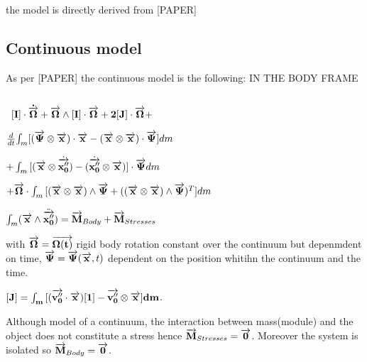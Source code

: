 the model is directly derived from [PAPER]
\subsection{Continuous model}
\label{Continuous model}

As per [PAPER] the continuous model is the following: IN THE BODY FRAME
\begin{center}
\begin{equation*} 
\end{equation*}
\end{center}\
$[\bf I]\cdot \dot{\overrightarrow{\bf \Omega}} + \overrightarrow{\bf \Omega} \wedge [\bf I]\cdot \overrightarrow{\bf \Omega} + 2[\bf J]\cdot \overrightarrow{\bf \Omega}+ $

${d\over dt}{\int_{m}[(\overrightarrow{\bf \Psi} \otimes \overrightarrow{\bf x})\cdot \overrightarrow{\bf x} - (\overrightarrow{\bf x}\otimes\overrightarrow{\bf x})\cdot \overrightarrow{\bf \Psi}]dm}$



$+ \int_{m}{[(\overrightarrow{\bf x}\otimes \dot{\overrightarrow{\bf x''_{0}}}) - (\dot{\overrightarrow{\bf x''_{0}}}\otimes \overrightarrow{\bf x}) ]\cdot \overrightarrow{\bf \Psi}dm}$

$+\overrightarrow{\bf \Omega}\cdot \int_{m}{[(\overrightarrow{\bf x}\otimes \overrightarrow{\bf x})\wedge \overrightarrow{\bf \Psi}+((\overrightarrow{\bf x}\otimes \overrightarrow{\bf x})\wedge \overrightarrow{\bf \Psi})^{T}]dm}$

$\int_{m}(\overrightarrow{\bf x}\wedge \ddot{\overrightarrow{\bf x''_{0}}})
=\overrightarrow{\bf M}_{Body} + \overrightarrow{\bf M}_{Stresses}$




with $\overrightarrow{\bf \Omega}=\overrightarrow{\bf \Omega(t)}$ rigid body rotation constant over the continuum but depenmdent on time, $\overrightarrow{\bf \Psi}=\overrightarrow{\bf \Psi}(\overrightarrow{\bf x},t)$ dependent on the position whitihn the continuum and the time. 

$[\bf J]= \int_{m}{[(\overrightarrow{\bf v''_{0}} \cdot \overrightarrow{\bf x})[\bf 1] - \overrightarrow{\bf v''_{0}}\otimes \overrightarrow{\bf x}]dm}$.

Although model of a continuum, the interaction between mass(module) and the object does not constitute a stress hence $\overrightarrow{\bf M}_{Stresses}=\overrightarrow{\bf 0}$. Moreover the system is isolated so $\overrightarrow{\bf M}_{Body}=\overrightarrow{\bf 0}$.

